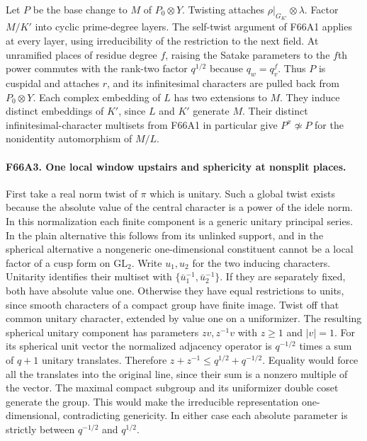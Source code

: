 Let $P$ be the base change to $M$ of $P_0\otimes Y$. Twisting
attaches $\rho|_{G_{K'}}\otimes\lambda$. Factor $M/K'$ into cyclic
prime-degree layers. The self-twist argument of F66A1 applies
at every layer, using irreducibility of the restriction to the
next field. At unramified places of residue degree $f$, raising
the Satake parameters to the $f$th power commutes with the
rank-two factor $q^{1/2}$ because $q_w=q_v^f$. Thus $P$ is
cuspidal and attaches $r$, and its infinitesimal characters
are pulled back from $P_0\otimes Y$. Each complex embedding of
$L$ has two extensions to $M$. They induce distinct embeddings
of $K'$, since $L$ and $K'$ generate $M$. Their distinct
infinitesimal-character multisets from F66A1 in particular
give $P^x\not\simeq P$ for the nonidentity automorphism of $M/L$.

\paragraph{F66A3. One local window upstairs and sphericity at nonsplit places.}
First take a real norm twist of $\pi$ which is unitary. Such
a global twist exists because the absolute value of the central
character is a power of the idele norm. In this normalization
each finite component is a generic unitary principal series.
In the plain alternative this follows from its unlinked support,
and in the spherical alternative a nongeneric one-dimensional
constituent cannot be a local factor of a cusp form on
$\mathrm{GL}_2$.  Write $u_1,u_2$ for the two inducing characters.
Unitarity identifies their multiset with
$\{\bar u_1^{-1},\bar u_2^{-1}\}$. If they are separately fixed,
both have absolute value one. Otherwise they have equal restrictions
to units, since smooth characters of a compact group have finite
image. Twist off that common unitary character, extended by value
one on a uniformizer. The resulting spherical unitary component has
parameters $zv,z^{-1}v$ with $z\ge1$ and $|v|=1$. For its spherical
unit vector the normalized adjacency operator is $q^{-1/2}$ times
a sum of $q+1$ unitary translates. Therefore
$z+z^{-1}\le q^{1/2}+q^{-1/2}$. Equality would force all the
translates into the original line, since their sum is a nonzero
multiple of the vector. The maximal compact subgroup and its
uniformizer double coset generate the group. This would make the
irreducible representation one-dimensional, contradicting genericity.
In either case each absolute parameter is strictly between
$q^{-1/2}$ and $q^{1/2}$.

